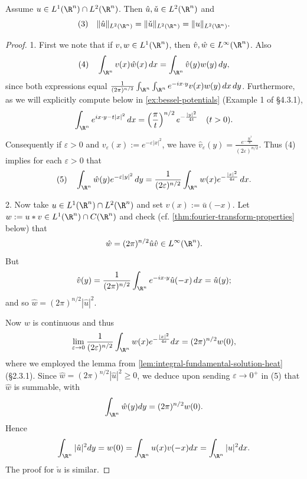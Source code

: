 \begin{theorem}
\label{thm:plancherel-theorem}
Assume $u \in L^1(\R^n) \cap L^2(\R^n)$. Then $\hat u, \check u \in L^2(\R^n)$ and
$$(3) \quad \|\hat u\|_{L^2(\R^n)} = \|\check u\|_{L^2(\R^n)} = \|u\|_{L^2(\R^n)}.$$
\end{theorem}
\begin{proof}
1. First we note that if $v, w \in L^1(\R^n)$, then $\hat v, \hat w \in L^\infty(\R^n)$. Also
$$(4) \quad \int_{\R^n} v(x)\hat w(x)\,dx = \int_{\R^n} \hat v(y)w(y)\,dy,$$
since both expressions equal $\frac{1}{(2\pi)^{n/2}}\int_{\R^n}\int_{\R^n} e^{-ix\cdot y}v(x)w(y)\,dx\,dy$. Furthermore, as we will explicitly compute below in \cref{ex:bessel-potentials} (Example 1 of \S4.3.1),
$$\int_{\R^n} e^{ix\cdot y-t|x|^2}\,dx = \left(\frac{\pi}{t}\right)^{n/2}e^{-\frac{|y|^2}{4t}} \quad (t>0).$$
Consequently if $\varepsilon>0$ and $v_\varepsilon(x):=e^{-\varepsilon|x|^2}$, we have $\hat v_\varepsilon(y) = \frac{e^{-\frac{|y|^2}{4\varepsilon}}}{(2\varepsilon)^{n/2}}$. Thus (4) implies for each $\varepsilon>0$ that
$$(5) \quad \int_{\R^n} \hat w(y)e^{-\varepsilon|y|^2}\,dy = \frac{1}{(2\varepsilon)^{n/2}}\int_{\R^n} w(x)e^{-\frac{|x|^2}{4\varepsilon}}\,dx.$$

2. Now take $u\in L^1(\R^n)\cap L^2(\R^n)$ and set $v(x):=\bar u(-x)$. Let $w:=u*v\in L^1(\R^n)\cap C(\R^n)$ and check (cf. \cref{thm:fourier-transform-properties} below) that
$$\hat w = (2\pi)^{n/2}\hat u\hat v \in L^\infty(\R^n).$$
But
$$\hat v(y) = \frac{1}{(2\pi)^{n/2}} \int_{\R^n} e^{-ix \cdot y} \hat u(-x)\, dx = \hat u(y);$$
and so $\hat w = (2\pi)^{n/2}|\hat u|^2$.

Now $w$ is continuous and thus
$$\lim_{\varepsilon \to 0} \frac{1}{(2\varepsilon)^{n/2}} \int_{\R^n} w(x)e^{-\frac{|x|^2}{4\varepsilon}} dx = (2\pi)^{n/2}w(0),$$
where we employed the lemma from \cref{lem:integral-fundamental-solution-heat} (\S2.3.1). Since $\hat w = (2\pi)^{n/2}|\hat u|^2 \geq 0$, we deduce upon sending $\varepsilon \to 0^+$ in (5) that $\hat w$ is summable, with
$$\int_{\R^n} \hat w(y) dy = (2\pi)^{n/2}w(0).$$
Hence
$$\int_{\R^n} |\hat u|^2 dy = w(0) = \int_{\R^n} u(x)v(-x) dx = \int_{\R^n} |u|^2 dx.$$
The proof for $\check u$ is similar.
\end{proof}

